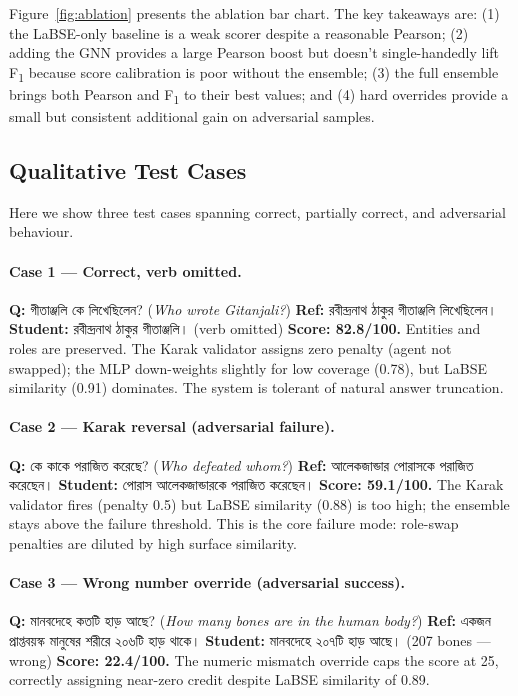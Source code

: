 \documentclass[11pt]{article}
\newcommand{\bn}[1]{{\bengalifont #1}}
\begin{document}
Figure~\ref{fig:ablation} presents the ablation bar chart. The key takeaways are: (1) the LaBSE-only baseline is a weak scorer despite a reasonable Pearson; (2) adding the GNN provides a large Pearson boost but doesn't single-handedly lift F\textsubscript{1} because score calibration is poor without the ensemble; (3) the full ensemble brings both Pearson and F\textsubscript{1} to their best values; and (4) hard overrides provide a small but consistent additional gain on adversarial samples.

\subsection{Qualitative Test Cases}

Here we show three test cases spanning correct, partially correct, and adversarial behaviour.

\paragraph{Case 1 — Correct, verb omitted.}
\textbf{Q:} \bn{গীতাঞ্জলি কে লিখেছিলেন?} (\textit{Who wrote Gitanjali?})
\textbf{Ref:} \bn{রবীন্দ্রনাথ ঠাকুর গীতাঞ্জলি লিখেছিলেন।}
\textbf{Student:} \bn{রবীন্দ্রনাথ ঠাকুর গীতাঞ্জলি।} (verb omitted)
\textbf{Score: 82.8/100.} Entities and roles are preserved. The Karak validator assigns zero penalty (agent not swapped); the MLP down-weights slightly for low coverage (0.78), but LaBSE similarity (0.91) dominates. The system is tolerant of natural answer truncation.

\paragraph{Case 2 — Karak reversal (adversarial failure).}
\textbf{Q:} \bn{কে কাকে পরাজিত করেছে?} (\textit{Who defeated whom?})
\textbf{Ref:} \bn{আলেকজান্ডার পোরাসকে পরাজিত করেছেন।}
\textbf{Student:} \bn{পোরাস আলেকজান্ডারকে পরাজিত করেছেন।}
\textbf{Score: 59.1/100.} The Karak validator fires (penalty 0.5) but LaBSE similarity (0.88) is too high; the ensemble stays above the failure threshold. This is the core failure mode: role-swap penalties are diluted by high surface similarity.

\paragraph{Case 3 — Wrong number override (adversarial success).}
\textbf{Q:} \bn{মানবদেহে কতটি হাড় আছে?} (\textit{How many bones are in the human body?})
\textbf{Ref:} \bn{একজন প্রাপ্তবয়স্ক মানুষের শরীরে ২০৬টি হাড় থাকে।}
\textbf{Student:} \bn{মানবদেহে ২০৭টি হাড় আছে।} (207 bones — wrong)
\textbf{Score: 22.4/100.} The numeric mismatch override caps the score at 25, correctly assigning near-zero credit despite LaBSE similarity of 0.89.
\end{document}
